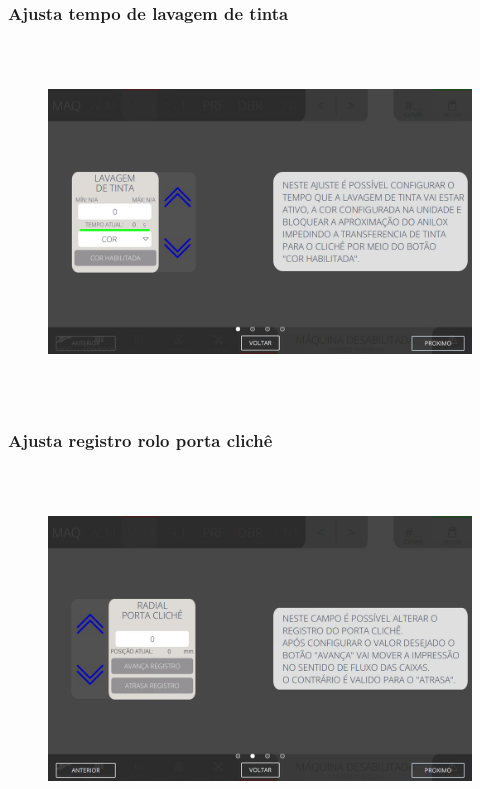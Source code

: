 \subsubsection{\small{Ajusta tempo de lavagem de tinta}}
\vspace*{\fill}
\begin{figure}[h]
  \centering
  \includegraphics[width=576px,height=360px]{src/imagesFlexo/04-printter/02-printter/settings/e-1.png}
\end{figure}
\vspace*{\fill}

\newpage
\thispagestyle{fancy}
\vspace*{40 pt}
\subsubsection{\small{Ajusta registro rolo porta clichê}}
\vspace*{\fill}
\begin{figure}[h]
  \centering
  \includegraphics[width=576px,height=360px]{src/imagesFlexo/04-printter/02-printter/settings/e-2.png}
\end{figure}
\vspace*{\fill}

